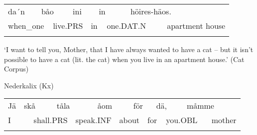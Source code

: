 \begin{tabular}{llllllllll}
\lsptoprule
da´n & \multicolumn{2}{l}{båo

} & \multicolumn{2}{l}{ini

} & \multicolumn{2}{l}{in

} & \multicolumn{2}{l}{höires-häos.

} & \\
\multicolumn{2}{l}{when\_one

} & \multicolumn{2}{l}{live.PRS

} & \multicolumn{2}{l}{in

} & \multicolumn{2}{l}{one.DAT.N

} & \multicolumn{2}{l}{apartment house

}\\
\lspbottomrule
\end{tabular}

\begin{styleTranslation}
‘I want to tell you, Mother, that I have always wanted to have a cat – but it isn’t possible to have a cat (lit. the cat) when you live in an apartment house.’ (Cat Corpus)

\end{styleTranslation}

\begin{styleExLtrTblii}
Nederkalix (Kx)

\end{styleExLtrTblii}

\begin{tabular}{llllllllllllll}
\lsptoprule
Jä & \multicolumn{2}{l}{skå

} & \multicolumn{2}{l}{tåla

} & \multicolumn{2}{l}{åom

} & \multicolumn{2}{l}{för

} & \multicolumn{2}{l}{dä,

} & \multicolumn{2}{l}{måmme

} & \\
\multicolumn{2}{l}{I

} & \multicolumn{2}{l}{shall.PRS

} & \multicolumn{2}{l}{speak.INF

} & \multicolumn{2}{l}{about

} & \multicolumn{2}{l}{for

} & \multicolumn{2}{l}{you.OBL

} & \multicolumn{2}{l}{mother

}\\
\lspbottomrule
\end{tabular}

